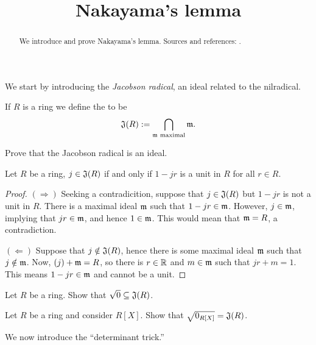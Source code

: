 \documentclass{ximera}
\title{Nakayama's lemma}
\begin{document}
\begin{abstract}
  We introduce and prove Nakayama's lemma. Sources and references:
  \cite{AM1969,jpS2000}.
\end{abstract}
\maketitle

We start by introducing the \textit{Jacobson radical}, an ideal related to the nilradical.

\begin{definition}
  If $R$ is a ring we define the  to be
  \[
  \mathfrak J(R) := \bigcap_{\mathfrak{m} \text{ maximal}}\mathfrak{m}.
  \]
\end{definition}

\begin{exercise}
  Prove that the Jacobson radical is an ideal.
\end{exercise}

\begin{proposition}\label{P:CharJR}
  Let $R$ be a ring, $j\in\mathfrak J(R)$ if and only if $1-jr$ is a unit in
  $R$ for all $r\in R$.
  \begin{proof}
    $(\Rightarrow)$ Seeking a contradicition, suppose that $j\in \mathfrak
    J(R)$ but $1-jr$ is not a unit in $R$. There is a maximal ideal
    $\mathfrak{m}$ such that $1-jr\in\mathfrak{m}$. However, $j\in\mathfrak{m}$, implying that
    $jr\in\mathfrak{m}$, and hence $1\in\mathfrak{m}$. This would mean that $\mathfrak{m} = R$, a
    contradiction.

    $(\Leftarrow)$ Suppose that $j\notin\mathfrak J(R)$, hence there is some
    maximal ideal $\mathfrak{m}$ such that $j\notin\mathfrak{m}$. Now, $(j)+\mathfrak{m} = R$, so
    there is $r\in\mathbb R$ and $m\in\mathfrak{m}$ such that $jr+m = 1$. This means
    $1-jr\in\mathfrak{m}$ and cannot be a unit.
  \end{proof}
\end{proposition}

\begin{exercise}
  Let $R$ be a ring. Show that $\sqrt{0}\subseteq \mathfrak J(R)$.
\end{exercise}

\begin{exercise}
  Let $R$ be a ring and consider $R[X]$. Show that $\sqrt{0_{R[X]}} =
  \mathfrak J(R)$.
\end{exercise}





We now introduce the ``determinant trick.''
\end{document}
